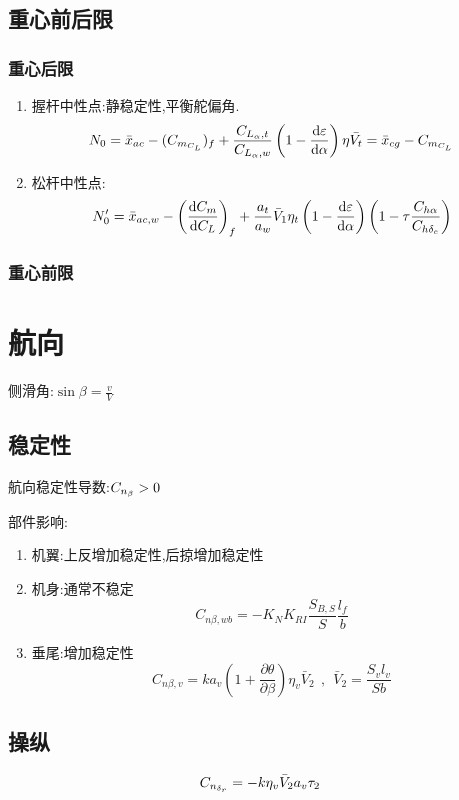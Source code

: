 \subsection{重心前后限}
\subsubsection{重心后限}
\begin{enumerate}[label=\arabic*.,topsep=0pt]
\setlength{\itemsep}{-2pt}
\item 握杆中性点:静稳定性,平衡舵偏角.
$$N_0=\bar{x}_{ac}-({C_{m_{C_L}}})_f+\frac{C_{L_\alpha,t}}{C_{L_\alpha,w}}\left(1-\frac{\operatorname{d\!} {\varepsilon}}{\operatorname{d\!} \alpha}\right)\eta\bar{V_t}=\bar{x}_{cg}-{C_{m_{C_L}}}$$
\item 松杆中性点:
$$N_0'=\bar{x}_{ac,w}-\left(\frac{\operatorname{d\!} {C_m}}{\operatorname{d\!} {C_L}}\right)_f+\frac{a_t}{a_w}\bar{V}_1 \eta_t\left(1-\frac{\operatorname{d\!} {\varepsilon}}{\operatorname{d\!} \alpha}\right)\left(1-\tau\frac{C_{h\alpha}}{C_{h\delta_e}}\right)$$

\end{enumerate}

\subsubsection{重心前限}

\section{航向}
侧滑角:$\displaystyle\sin \beta=\frac{v}{V}$
\subsection{稳定性}
航向稳定性导数:$C_{n_\beta}>0$

部件影响:
\begin{enumerate}[label=\arabic*.,topsep=0pt]
\setlength{\itemsep}{-2pt}
\item 机翼:上反增加稳定性,后掠增加稳定性
\item 机身:通常不稳定
$$C_{n\beta,wb}=-K_NK_{RI}\frac{S_{B,S}}{S}\frac{l_f}{b}$$
\item 垂尾:增加稳定性
$$C_{n\beta,v}=k a_v\left(1+\frac{\partial \theta}{\partial \beta}\right)\eta_v \bar{V}_2\ \ ,\ \ \bar{V}_2=\frac{S_vl_v}{Sb}$$
\end{enumerate}

\subsection{操纵}
$$C_{n_{\delta_r}}=-k\eta_v\bar{V}_2a_v\tau_2$$

